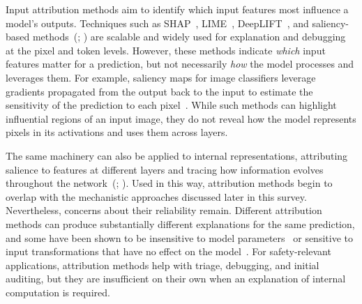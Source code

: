 Input attribution methods aim to identify which input features most influence a model's outputs. Techniques such as SHAP~, LIME~, DeepLIFT~, and saliency-based methods~(; ) are scalable and widely used for explanation and debugging at the pixel and token levels. However, these methods indicate \textit{which} input features matter for a prediction, but not necessarily \textit{how} the model processes and leverages them. For example, saliency maps for image classifiers leverage gradients propagated from the output back to the input to estimate the sensitivity of the prediction to each pixel~. While such methods can highlight influential regions of an input image, they do not reveal how the model represents pixels in its activations and uses them across layers.

The same machinery can also be applied to internal representations, attributing salience to features at different layers and tracing how information evolves throughout the network~(; ). Used in this way, attribution methods begin to overlap with the mechanistic approaches discussed later in this survey. Nevertheless, concerns about their reliability remain. Different attribution methods can produce substantially different explanations for the same prediction, and some have been shown to be insensitive to model parameters~ or sensitive to input transformations that have no effect on the model~. For safety-relevant applications, attribution methods help with triage, debugging, and initial auditing, but they are insufficient on their own when an explanation of internal computation is required.



